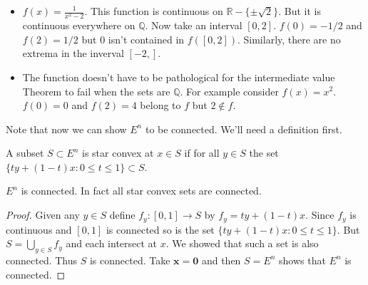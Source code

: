 \begin{itemize}
    \item $f(x) = \frac{1}{x^2-2}.$ This function is continuous on $\mathbb{R} - \lbrace \pm
	\sqrt{2} \rbrace$. But it is continuous everywhere on $\mathbb{Q}$. Now take an interval
	$\left[0,2\right]$. $f(0) = -1/2$ and $f(2) = 1/2$ but $0$ isn't contained in
	$f(\left[0,2\right])$. Similarly, there are no extrema in the inverval $\left[-2,\right]$.

    \item The function doesn't have to be pathological for the intermediate value Theorem to fail
	when the sets are $\mathbb{Q}$. For example consider $f(x) =x^2$. $f(0) = 0$ and $f(2) = 4$
	belong to $f$ but $2 \not \in f$.
\end{itemize}
Note that now we can show $E^n$ to be connected. We'll need a definition first.
\begin{Definition}
    A subset $S \subset E^n$ is star convex at $x \in S$ if for all $y \in S$ the set $\left.\lbrace
    ty + (1-t)x : 0 \leq t \leq 1 \rbrace \right. \subset S$.  
\end{Definition}
\begin{Corollary}
    $E^n$ is connected. In fact all star convex sets are connected.
\end{Corollary}
\begin{proof}
    Given any $y \in S$ define $f_y : \left[0,1\right] \to S$ by $f_y = ty + (1-t)x$. Since $f_y$ is
    continuous and $\left[0,1\right]$ is connected so is the set $\left.\lbrace	ty + (1-t)x : 0 
    \leq t \leq 1 \rbrace \right.$. But $S = \bigcup_{y \in S}f_y$ and each intersect at $x$. We
    showed that such a set is also connected. Thus $S$ is connected. Take $\mathbf{x} = \mathbf{0}$
    and then $S = E^n$ shows that $E^n$ is connected.
\end{proof}

